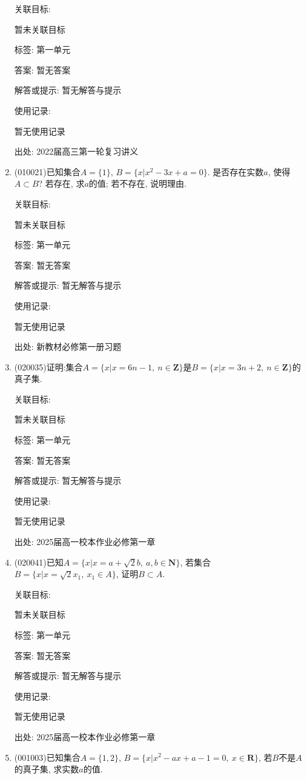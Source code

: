 \documentclass[10pt,a4paper]{article}
\begin{document}
\begin{enumerate}[1.]
关联目标:

暂未关联目标



标签: 第一单元

答案: 暂无答案

解答或提示: 暂无解答与提示

使用记录:

暂无使用记录


出处: 2022届高三第一轮复习讲义
\item { (010021)}已知集合$A=\{1\}$, $B=\{x|x^2-3x+a=0\}$. 是否存在实数$a$, 使得$A\subset B$?  若存在, 求$a$的值; 若不存在, 说明理由.


关联目标:

暂未关联目标



标签: 第一单元

答案: 暂无答案

解答或提示: 暂无解答与提示

使用记录:

暂无使用记录


出处: 新教材必修第一册习题
\item { (020035)}证明:集合$A=\{x|x=6n-1, \ n\in\mathbf{Z}\}$是$B=\{x|x=3n+2, \ n\in\mathbf{Z}\}$的真子集.


关联目标:

暂未关联目标



标签: 第一单元

答案: 暂无答案

解答或提示: 暂无解答与提示

使用记录:

暂无使用记录


出处: 2025届高一校本作业必修第一章
\item { (020041)}已知$A=\{x|x=a+\sqrt 2b,\ a,b\in \mathbf{N}\}$, 若集合$B=\{x|x=\sqrt 2x_1,\  x_1 \in A\}$, 证明$B\subset A$.


关联目标:

暂未关联目标



标签: 第一单元

答案: 暂无答案

解答或提示: 暂无解答与提示

使用记录:

暂无使用记录


出处: 2025届高一校本作业必修第一章
\item { (001003)}已知集合$A=\{1,2\}$, $B=\{x|x^2-ax+a-1=0,\ x\in\mathbf{R}\}$, 若$B$不是$A$的真子集, 求实数$a$的值.



\end{enumerate}
\end{document}
